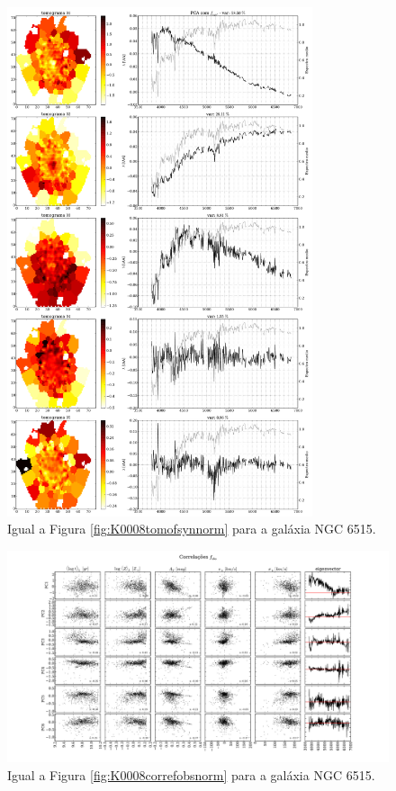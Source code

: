 \begin{figure}
    \includegraphics[width=0.8\textwidth]{figuras/K0864-tomo-syn-norm.pdf}
    \caption[Tomogramas de 1 a 5 para o cubo $f_{syn}$ - NGC 6515.]
    {Igual a Figura \ref{fig:K0008tomofsynnorm} para a galáxia NGC 6515.}
    \label{fig:K0864tomofsynnorm}
\end{figure}

\begin{figure}
    \includegraphics[width=1.2\textwidth, angle=-90]{figuras/K0864-correl-f_obs_norm-PCvsPhys.pdf}
	\caption[Correlações PCs vs. par\^ametros f\'isicos - $f_{obs}$ - NGC 6515.]
	{Igual a Figura \ref{fig:K0008correfobsnorm} para a galáxia NGC 6515.}
    \label{fig:K0864correfobsnorm}
\end{figure}

